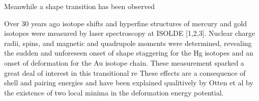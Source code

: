 

Meanwhile a shape transition has been observed

Over 30 years ago isotope shifts and hyperfine structures of mercury and gold isotopes were measured by laser spectroscopy at ISOLDE [1,2,3]. Nuclear charge radii, spins, and magnetic and quadrupole moments were determined, revealing the sudden and unforeseen onset of shape staggering for the Hg isotopes and an onset of deformation for the Au isotope chain.  These measurement sparked a great deal of interest in this transitional re
These effects are a consequence of shell and pairing energies and have been explained qualitively by Otten et al by the existence of two local minima in the deformation energy potential.

